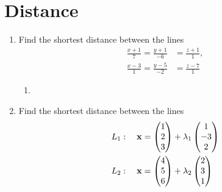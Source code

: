 \documentclass[journal,12pt,twocolumn]{IEEEtran}
\renewcommand\thesection{\arabic{section}}
\begin{document}
\section{Distance}
\renewcommand{\theequation}{\theenumi}
\begin{enumerate}[label=\thesection.\arabic*.,ref=\thesection.\theenumi]
\item Find the shortest distance between the lines 
\begin{align}
\frac{x+1}{7} = \frac{y+1}{-6} &= \frac{z+1}{1}, 
\\
\frac{x-3}{1} = \frac{y-5}{-2} &= \frac{z-7}{1} 
\end{align}
%
\solution 
\begin{enumerate}
\item %
\end{enumerate}
\item Find the shortest distance between the lines 
\begin{align}
L_1: \quad \mathbf{x} &= \begin{pmatrix}1\\2\\3\end{pmatrix} + \lambda_1\begin{pmatrix}1 \\ -3 \\2\end{pmatrix}
\\
L_2: \quad \mathbf{x} &= \begin{pmatrix}4\\5\\6\end{pmatrix} + \lambda_2\begin{pmatrix}2 \\ 3 \\1\end{pmatrix}
\end{align}
%
\solution 
%


\end{enumerate}
\end{document}
